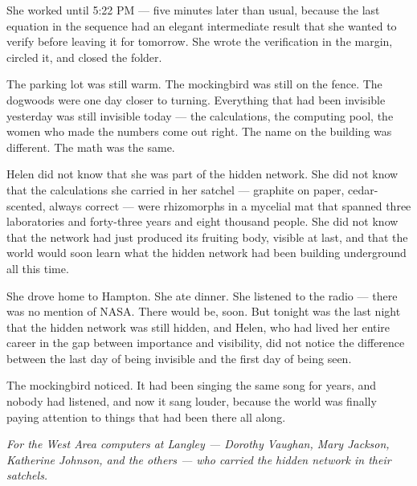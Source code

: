 \documentclass[12pt, letterpaper]{article}
\begin{document}
She worked until 5:22 PM --- five minutes later than usual, because the last equation in the sequence had an elegant intermediate result that she wanted to verify before leaving it for tomorrow. She wrote the verification in the margin, circled it, and closed the folder.

The parking lot was still warm. The mockingbird was still on the fence. The dogwoods were one day closer to turning. Everything that had been invisible yesterday was still invisible today --- the calculations, the computing pool, the women who made the numbers come out right. The name on the building was different. The math was the same.

Helen did not know that she was part of the hidden network. She did not know that the calculations she carried in her satchel --- graphite on paper, cedar-scented, always correct --- were rhizomorphs in a mycelial mat that spanned three laboratories and forty-three years and eight thousand people. She did not know that the network had just produced its fruiting body, visible at last, and that the world would soon learn what the hidden network had been building underground all this time.

She drove home to Hampton. She ate dinner. She listened to the radio --- there was no mention of NASA. There would be, soon. But tonight was the last night that the hidden network was still hidden, and Helen, who had lived her entire career in the gap between importance and visibility, did not notice the difference between the last day of being invisible and the first day of being seen.

The mockingbird noticed. It had been singing the same song for years, and nobody had listened, and now it sang louder, because the world was finally paying attention to things that had been there all along.

\vspace{2em}
\begin{center}
\textit{For the West Area computers at Langley --- Dorothy Vaughan, Mary Jackson,\\Katherine Johnson, and the others --- who carried the hidden network in their satchels.}
\end{center}
\end{document}
